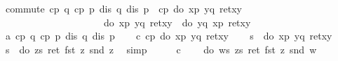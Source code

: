 \begin{isabellebody}
\isanewline
{}\ commute{\isacharunderscore}{}{\isacharunderscore}{}{\isacharcolon}\ {\isachardoublequote}{\isasymlbrakk}cp\ q{\isacharsemicolon}\ cp\ p{\isacharsemicolon}\ dis\ q{\isacharsemicolon}\ dis\ p{\isasymrbrakk}\ {\isasymLongrightarrow}\ cp\ {\isacharparenleft}do\ {\isacharbraceleft}x{\isasymleftarrow}p{\isacharsemicolon}\ y{\isasymleftarrow}q{\isacharsemicolon}\ ret{\isacharparenleft}x{\isacharcomma}y{\isacharparenright}{\isacharbraceright}{\isacharparenright}\isanewline
\ \ \ \ \ \ \ \ \ \ \ \ \ \ \ \ \ \ \ \ {\isasymLongrightarrow}\ do\ {\isacharbraceleft}x{\isasymleftarrow}p{\isacharsemicolon}\ y{\isasymleftarrow}q{\isacharsemicolon}\ ret{\isacharparenleft}x{\isacharcomma}y{\isacharparenright}{\isacharbraceright}\ {\isacharequal}\ do\ {\isacharbraceleft}y{\isasymleftarrow}q{\isacharsemicolon}\ x{\isasymleftarrow}p{\isacharsemicolon}\ ret{\isacharparenleft}x{\isacharcomma}y{\isacharparenright}{\isacharbraceright}{\isachardoublequote}\isanewline
\isamarkupfalse%
\ {\isacharminus}\isanewline
\ \ \isamarkupfalse%
\ a{\isacharcolon}\ {\isachardoublequote}cp\ q{\isachardoublequote}\ {\isachardoublequote}cp\ p{\isachardoublequote}\ {\isachardoublequote}dis\ q{\isachardoublequote}\ {\isachardoublequote}dis\ p{\isachardoublequote}\isanewline
\ \ \isamarkupfalse%
\ c{\isacharcolon}\ {\isachardoublequote}cp\ {\isacharparenleft}do\ {\isacharbraceleft}x{\isasymleftarrow}p{\isacharsemicolon}\ y{\isasymleftarrow}q{\isacharsemicolon}\ ret{\isacharparenleft}x{\isacharcomma}y{\isacharparenright}{\isacharbraceright}{\isacharparenright}{\isachardoublequote}\isanewline
\ \ \isamarkupfalse%
\ {\isacharquery}s\ {\isacharequal}\ {\isachardoublequote}do\ {\isacharbraceleft}x{\isasymleftarrow}p{\isacharsemicolon}\ y{\isasymleftarrow}q{\isacharsemicolon}\ ret{\isacharparenleft}x{\isacharcomma}y{\isacharparenright}{\isacharbraceright}{\isachardoublequote}\isanewline
\ \ \isamarkupfalse%
\ {\isachardoublequote}{\isacharquery}s\ {\isacharequal}\ do\ {\isacharbraceleft}z{\isasymleftarrow}{\isacharquery}s{\isacharsemicolon}\ ret\ {\isacharparenleft}fst\ z{\isacharcomma}\ snd\ z{\isacharparenright}{\isacharbraceright}{\isachardoublequote}\ \isamarkupfalse%
\ simp\isanewline
\ \ \isamarkupfalse%
\ \isamarkupfalse%
\ c\ \isamarkupfalse%
\ {\isachardoublequote}{\isasymdots}\ {\isacharequal}\ do\ {\isacharbraceleft}w{\isasymleftarrow}{\isacharquery}s{\isacharsemicolon}\ z{\isasymleftarrow}{\isacharquery}s{\isacharsemicolon}\ ret\ {\isacharparenleft}fst\ z{\isacharcomma}\ snd\ w{\isacharparenright}{\isacharbraceright}{\isachardoublequote}\ \isamarkupfalse%

\end{isabellebody}
